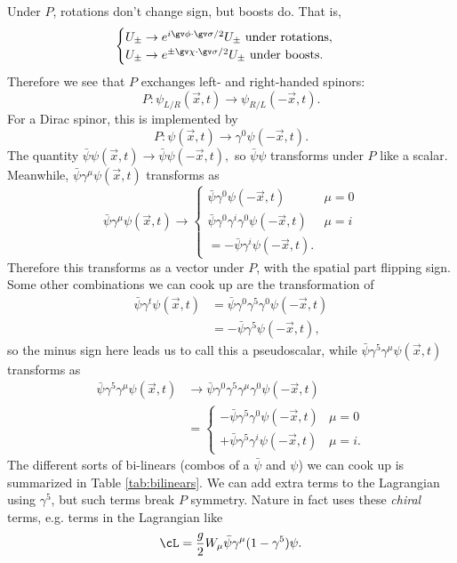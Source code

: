 Under $P$, rotations don't change sign, but boosts do. That is,
$$\begin{cases}
U_\pm \to e^{i\gv \phi \cdot \gv \sigma/2} U_\pm \text{ under rotations},\\
U_\pm \to e^{\pm\gv \chi \cdot \gv \sigma/2} U_\pm \text{ under boosts}.
\end{cases}$$
Therefore we see that $P$ exchanges left- and right-handed spinors:
$$P: \psi_{L/R}(\vec x,t)\to \psi_{R/L}(-\vec x, t).$$
For a Dirac spinor, this is implemented by
$$P:\psi(\vec x,t)\to \gamma^0 \psi(-\vec x,t).$$
The quantity $\bar \psi \psi(\vec x,t)\to \bar \psi \psi(-\vec x,t),$ so $\bar \psi \psi$ transforms under $P$ like a scalar. Meanwhile, $\bar \psi \gamma^\mu \psi(\vec x,t)$ transforms as
$$\bar \psi \gamma^\mu \psi(\vec x,t) \to\begin{cases}
\bar \psi \gamma^0 \psi(-\vec x,t) & \mu=0\\
\bar \psi \gamma^0 \gamma^i \gamma^0 \psi(-\vec x,t)& \mu = i\\ = -\bar \psi \gamma^i \psi(-\vec x,t).
\end{cases}$$
Therefore this transforms as a vector under $P$, with the spatial part flipping sign. Some other combinations we can cook up are the transformation of%
\begin{align*}
    \bar \psi \gamma^t \psi(\vec x,t)&=\bar \psi \gamma^0 \gamma^5 \gamma^0 \psi(-\vec x,t)\\
    &= -\bar \psi \gamma^5 \psi(-\vec x,t),
\end{align*}
so the minus sign here leads us to call this a pseudoscalar, while $\bar \psi \gamma^5 \gamma^\mu \psi(\vec x,t)$ transforms as
\begin{align*}
    \bar \psi \gamma^5 \gamma^\mu \psi(\vec x,t)
    &\to \bar \psi \gamma^0 \gamma^5 \gamma^\mu \gamma^0\psi(-\vec x,t)\\
    &=\begin{cases}
    -\bar\psi \gamma^5 \gamma^0 \psi(-\vec x,t) & \mu=0\\
    +\bar\psi \gamma^5 \gamma^i \psi(-\vec x,t) & \mu=i.
    \end{cases}
\end{align*}
The different sorts of bi-linears (combos of a $\bar \psi$ and $\psi$) we can cook up is summarized in Table \ref{tab:bilinears}. We can add extra terms to the Lagrangian using $\gamma^5$, but such terms break $P$ symmetry. Nature in fact uses these \emph{chiral} terms, e.g. terms in the Lagrangian like
$$\cL=\frac{g}{2}W_\mu \bar\psi \gamma^\mu(1-\gamma^5)\psi.$$

